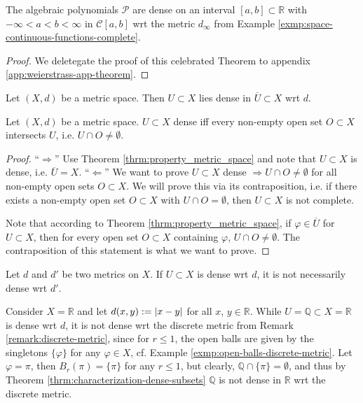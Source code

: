 \begin{exmp}\label{exmp:weierstrass-approx-thrm}
	The algebraic polynomials $\mathcal P$ are dense on an interval $[a, b]\subset \mathbb R$ with $-\infty < a < b < \infty$ in $\mathcal C[a, b]$ wrt the metric $d_{\infty}$ from Example \ref{exmp:space-continuous-functions-complete}. \cite[Corollary 6.12]{iske:approximation}
\end{exmp}

\begin{proof}
	We deletegate the proof of this celebrated Theorem to appendix \ref{app:weierstrass-app-theorem}. 
\end{proof}

\begin{exmp}
	Let $(X, d)$ be a metric space. Then $U\subset X$ lies dense in $\overline{U}\subset X$ wrt $d$.
\end{exmp}

\begin{theorem}\label{thrm:characterization-dense-subsets}
	Let $(X, d)$ be a metric space. $U\subset X$ dense iff every non-empty open set $O\subset X$ intersects $U$, i.e. $U\cap O\ne\emptyset$.
\end{theorem}

\begin{proof}
	\enquote{$\Longrightarrow$} Use Theorem \ref{thrm:property_metric_space} and note that $U\subset X$ is dense, i.e. $\overline{U} = X$.
	\newline\newline\enquote{$\Longleftarrow$} We want to prove $U\subset X$ dense $\Rightarrow U\cap O\ne\emptyset$ for all non-empty open sets $O\subset X$. We will prove this via its contraposition, i.e. if there exists a non-empty open set $O\subset X$ with $U\cap O=\emptyset$, then $U\subset X$ is not complete.
	
	Note that according to Theorem \ref{thrm:property_metric_space}, if $\varphi\in\overline{U}$ for $U\subset X$, then for every open set $O\subset X$ containing $\varphi$, $U\cap O\ne\emptyset$. The contraposition of this statement is what we want to prove.
\end{proof}

\begin{remark}
	Let $d$ and $d'$ be two metrics on $X$. If $U\subset X$ is dense wrt $d$, it is not necessarily dense wrt $d'$.
\end{remark}

\begin{exmp}
	Consider $X=\mathbb R$ and let $d(x, y) := \left\vert x - y \right\vert$ for all $x$, $y\in\mathbb R$. While $U = \mathbb Q \subset X = \mathbb R$ is dense wrt $d$, it is not dense wrt the discrete metric from Remark \ref{remark:discrete-metric}, since for $r \leq 1$, the open balls are given by the singletons $\{\varphi\}$ for any $\varphi\in X$, cf. Example \ref{exmp:open-balls-discrete-metric}. Let $\varphi = \pi$, then $B_{r}(\pi) = \{\pi\}$ for any $r\leq 1$, but clearly, $\mathbb Q \cap \{\pi\} = \emptyset$, and thus by Theorem \ref{thrm:characterization-dense-subsets} $\mathbb Q$ is not dense in $\mathbb R$ wrt the discrete metric.
\end{exmp}

